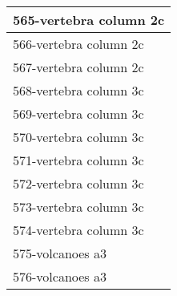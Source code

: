 \begin{table}[h]
\begin{center}
\begin{tabular}{l}
565-vertebra column 2c &  \\ \hline
566-vertebra column 2c &  \\
567-vertebra column 2c &  \\
568-vertebra column 3c &  \\
569-vertebra column 3c &  \\
570-vertebra column 3c &  \\
571-vertebra column 3c &  \\
572-vertebra column 3c &  \\ \hline
573-vertebra column 3c &  \\
574-vertebra column 3c &  \\
575-volcanoes a3 &  \\
576-volcanoes a3 &  \\\end{tabular}\label{stratsALCKappa17AllReduxb}
\end{center}
\end{table}
